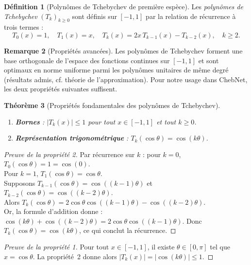 \documentclass[12pt, a4paper]{article}
\newtheorem{theorem}{Théorème}[section]
\theoremstyle{definition}
\newtheorem{definition}[theorem]{Définition}
\newtheorem{remark}[theorem]{Remarque}
\begin{document}
\begin{definition}[Polynômes de Tchebychev de première espèce]
Les \emph{polynômes de Tchebychev} $(T_k)_{k \geq 0}$ sont définis sur $[-1, 1]$
par la relation de récurrence à trois termes :
\[
  \boxed{
    T_0(x) = 1, \quad
    T_1(x) = x, \quad
    T_k(x) = 2x\, T_{k-1}(x) - T_{k-2}(x), \quad k \geq 2.
  }
\]
\end{definition}

\begin{remark}[Propriétés avancées]
Les polynômes de Tchebychev forment une base orthogonale de l'espace des fonctions
continues sur $[-1, 1]$ et sont optimaux en norme uniforme parmi les polynômes unitaires
de même degré (résultats admis, cf. théorie de l'approximation).
Pour notre usage dans ChebNet, les deux propriétés suivantes suffisent.
\end{remark}

\begin{theorem}[Propriétés fondamentales des polynômes de Tchebychev]
\label{thm:cheby_properties}
\begin{enumerate}
  \item \textbf{Bornes} : $|T_k(x)| \leq 1$ pour tout $x \in [-1, 1]$ et tout $k \geq 0$.
  \item \textbf{Représentation trigonométrique} : $T_k(\cos\theta) = \cos(k\theta)$.
\end{enumerate}
\end{theorem}

\begin{proof}[Preuve de la propriété 2]
Par récurrence sur $k$ : pour $k = 0$, $T_0(\cos\theta) = 1 = \cos(0)$. \\
Pour $k = 1$, $T_1(\cos\theta) = \cos\theta$. \\
Supposons $T_{k-1}(\cos\theta) = \cos((k-1)\theta)$ et $T_{k-2}(\cos\theta) = \cos((k-2)\theta)$. \\
Alors $T_k(\cos\theta) = 2\cos\theta \cos((k-1)\theta) - \cos((k-2)\theta)$. \\
Or, la formule d'addition donne :
$\cos(k\theta) + \cos((k-2)\theta) = 2\cos\theta \cos((k-1)\theta)$.
Donc $T_k(\cos\theta) = \cos(k\theta)$, ce qui conclut la récurrence.
\end{proof}

\begin{proof}[Preuve de la propriété 1]
Pour tout $x \in [-1,1]$, il existe $\theta \in [0, \pi]$ tel que $x = \cos\theta$.
La propriété~2 donne alors $|T_k(x)| = |\cos(k\theta)| \leq 1$.
\end{proof}
\end{document}
